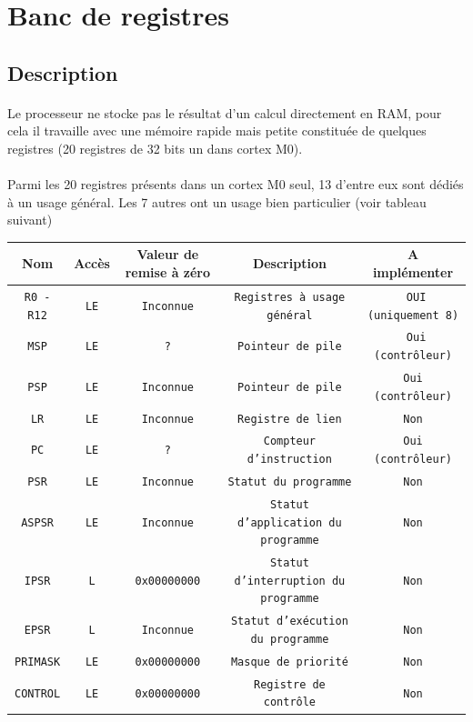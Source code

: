 \section{Banc de registres}

\subsection{Description}

	\paragraph{}
	Le processeur ne stocke pas le résultat d'un calcul directement en RAM, pour cela il travaille avec une mémoire rapide mais petite constituée de quelques registres (20 registres  de 32 bits un dans cortex M0).


	\paragraph{}
	Parmi les 20 registres présents dans un cortex M0 seul, 13 d'entre eux sont dédiés à un usage général. Les 7 autres ont un usage bien particulier (voir tableau suivant)

\begin{tabular}{|c|c|c|c|c|}
\hline
\textbf{Nom} 	 & \textbf{Accès}              & \textbf{Valeur de remise à zéro} & \textbf{Description} & \textbf{A implémenter}\\
\hline
\texttt{R0 - R12} &  \texttt{LE} &  \texttt{Inconnue}		  &  \texttt{Registres à usage général} &  \texttt{ OUI (uniquement 8)}\\
\hline
\texttt{MSP} 	 &  \texttt{LE} &  \texttt{?} 			  &  \texttt{Pointeur de pile} &  \texttt{ Oui (contrôleur)}\\
\hline
\texttt{PSP}	 &  \texttt{LE} &  \texttt{Inconnue} 		  &  \texttt{Pointeur de pile} &  \texttt{Oui (contrôleur)}\\
\hline
\texttt{LR} 	 &  \texttt{LE} &  \texttt{Inconnue} 		  &  \texttt{Registre de lien} &  \texttt{Non}\\
\hline
\texttt{PC} 	 &  \texttt{LE} &  \texttt{?} 			  &  \texttt{Compteur d'instruction} &  \texttt{Oui (contrôleur)}\\
\hline
\texttt{PSR} 	 &  \texttt{LE} &  \texttt{Inconnue} 		  &  \texttt{Statut du programme} &  \texttt{Non}\\
\hline
\texttt{ASPSR} 	 &  \texttt{LE} &  \texttt{Inconnue} 		  &  \texttt{Statut d'application du programme} &  \texttt{Non}\\
\hline
\texttt{IPSR} 	 &  \texttt{L}      &  \texttt{0x00000000} 		  &  \texttt{Statut d'interruption du programme} &  \texttt{Non}\\
\hline
\texttt{EPSR} 	 &  \texttt{L}      &  \texttt{Inconnue} 		  &  \texttt{Statut d'exécution du programme} &  \texttt{Non}\\
\hline
\texttt{PRIMASK}  &  \texttt{LE} &  \texttt{0x00000000} 		  &  \texttt{Masque de priorité} &  \texttt{Non}\\
\hline
\texttt{CONTROL}  &  \texttt{LE} &  \texttt{0x00000000} 		  &  \texttt{Registre de contrôle} &  \texttt{Non}\\
\hline
\end{tabular}


